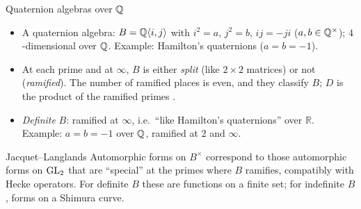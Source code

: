 \begin{frame}{Quaternion algebras over $\mathbb{Q}$}
  \small
  \begin{itemize}\setlength{\itemsep}{4pt}
    \item A quaternion algebra: $B=\mathbb{Q}\langle i,j\rangle$ with $i^2=a$, $j^2=b$, $ij=-ji$ ($a,b\in\mathbb{Q}^\times$); $4$-dimensional over $\mathbb{Q}$.
      Example: Hamilton's quaternions ($a=b=-1$).
    \item At each prime and at $\infty$, $B$ is either \emph{split} (like $2\times2$ matrices) or not (\emph{ramified}).
      The number of ramified places is even, and they classify $B$; $D$ is the product of the ramified primes .
    \item \emph{Definite} $B$: ramified at $\infty$, i.e.\ ``like Hamilton's quaternions'' over $\mathbb R$.
      Example: $a=b=-1$ over $\mathbb{Q}$, ramified at $2$ and $\infty$.
  \end{itemize}
  \begin{block}{Jacquet--Langlands}
    Automorphic forms on $B^\times$ correspond to those automorphic forms on $\mathrm{GL}_2$ that are ``special'' at the primes where $B$
    ramifies, compatibly with Hecke operators. For definite $B$ these are functions on a finite set; for indefinite $B$, forms on a
    Shimura curve. 
  \end{block}
\end{frame}
